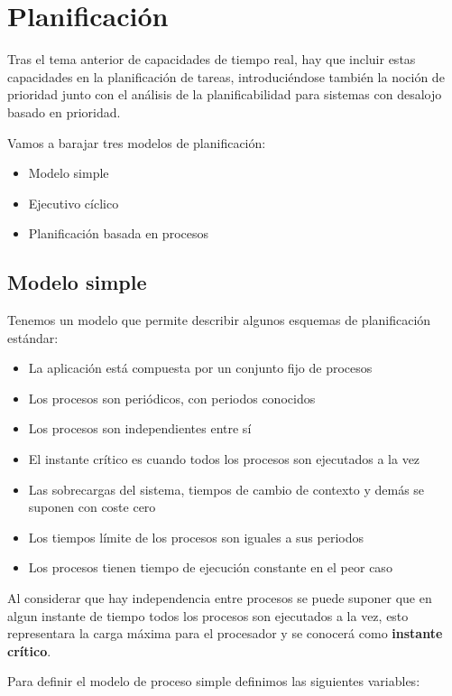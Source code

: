 \section{Planificación}

Tras el tema anterior de capacidades de tiempo real, hay que incluir estas
capacidades en la planificación de tareas, introduciéndose también la noción de
prioridad junto con el análisis de la planificabilidad para sistemas con
desalojo basado en prioridad.

Vamos a barajar tres modelos de planificación:

\begin{itemize}
	\item Modelo simple
	\item Ejecutivo cíclico
	\item Planificación basada en procesos
\end{itemize}

\subsection{Modelo simple}

Tenemos un modelo que permite describir algunos esquemas de planificación
estándar:

\begin{itemize}
	\item La aplicación está compuesta por un conjunto fijo de procesos
	\item Los procesos son periódicos, con periodos conocidos
	\item Los procesos son independientes entre sí
	\item El instante crítico es cuando todos los procesos son ejecutados a
		la vez
	\item Las sobrecargas del sistema, tiempos de cambio de contexto y demás
		se suponen con coste cero
	\item Los tiempos límite de los procesos son iguales a sus periodos
	\item Los procesos tienen tiempo de ejecución constante en el peor caso
\end{itemize}

Al considerar que hay independencia entre procesos se puede suponer que en algun
instante de tiempo todos los procesos son ejecutados a la vez, esto representara
la carga máxima para el procesador y se conocerá como \textbf{instante crítico}.

Para definir el modelo de proceso simple definimos las siguientes variables:

